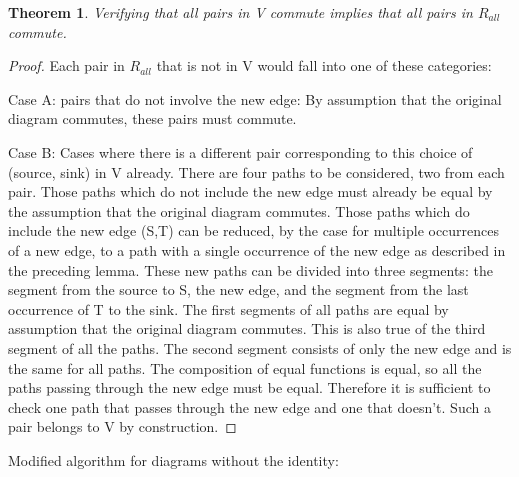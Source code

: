 \documentclass{article}
\newtheorem{theorem}{Theorem}
\begin{document}
\begin{theorem}
\label{verifyingSet}
Verifying that all pairs in V commute implies that all pairs in $R_{all}$ commute.
\end{theorem}
\begin{proof}

Each pair in $R_{all}$ that is not in V would fall into one of these categories:

Case A: pairs that do not involve the new edge: By assumption that the original diagram commutes, these pairs must commute.

Case B: Cases where there is a different pair corresponding to this choice of (source, sink) in V already.
There are four paths to be considered, two from each pair. Those paths which do not include the new edge must already be equal by the assumption that the original diagram commutes.
Those paths which do include the new edge (S,T) can be reduced, by the case for multiple occurrences of a new edge, to a path with a single occurrence of the new edge as described in the preceding lemma. These new paths can be divided into three segments: the segment from the source to S, the new edge, and the segment from the last occurrence of T to the sink. The first segments of all paths are equal by assumption that the original diagram commutes. This is also true of the third segment of all the paths. The second segment consists of only the new edge and is the same for all paths. The composition of equal functions is equal, so all the paths passing through the new edge must be equal.
Therefore it is sufficient to check one path that passes through the new edge and one that doesn't. Such a pair belongs to V by construction.
\end{proof}

Modified algorithm for diagrams without the identity:
\end{document}
